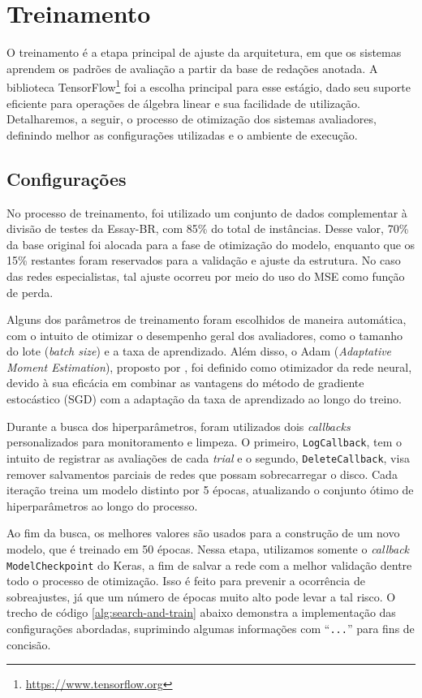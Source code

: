 \section{Treinamento}

O treinamento é a etapa principal de ajuste da arquitetura, em que os sistemas aprendem os padrões de avaliação a partir da base de redações anotada. A biblioteca TensorFlow\footnote{\url{https://www.tensorflow.org}} foi a escolha principal para esse estágio, dado seu suporte eficiente para operações de álgebra linear e sua facilidade de utilização. Detalharemos, a seguir, o processo de otimização dos sistemas avaliadores, definindo melhor as configurações utilizadas e o ambiente de execução.

\subsection{Configurações}
\label{subsec:training-configurations}

No processo de treinamento, foi utilizado um conjunto de dados complementar à divisão de testes da Essay-BR, com 85\% do total de instâncias. Desse valor, 70\% da base original foi alocada para a fase de otimização do modelo, enquanto que os 15\% restantes foram reservados para a validação e ajuste da estrutura. No caso das redes especialistas, tal ajuste ocorreu por meio do uso do MSE como função de perda.

Alguns dos parâmetros de treinamento foram escolhidos de maneira automática, com o intuito de otimizar o desempenho geral dos avaliadores, como o tamanho do lote (\textit{batch size}) e a taxa de aprendizado. Além disso, o Adam (\textit{Adaptative Moment Estimation}), proposto por \citet{kingma2017adam}, foi definido como otimizador da rede neural, devido à sua eficácia em combinar as vantagens do método de gradiente estocástico (SGD) com a adaptação da taxa de aprendizado ao longo do treino.

Durante a busca dos hiperparâmetros, foram utilizados dois \textit{callbacks} personalizados para monitoramento e limpeza. O primeiro, \texttt{LogCallback}, tem o intuito de registrar as avaliações de cada \textit{trial} e o segundo, \texttt{DeleteCallback}, visa remover salvamentos parciais de redes que possam sobrecarregar o disco. Cada iteração treina um modelo distinto por 5 épocas, atualizando o conjunto ótimo de hiperparâmetros ao longo do processo.

Ao fim da busca, os melhores valores são usados para a construção de um novo modelo, que é treinado em 50 épocas. Nessa etapa, utilizamos somente o \textit{callback} \texttt{ModelCheckpoint} do Keras, a fim de salvar a rede com a melhor validação dentre todo o processo de otimização. Isso é feito para prevenir a ocorrência de sobreajustes, já que um número de épocas muito alto pode levar a tal risco. O trecho de código \ref{alg:search-and-train} abaixo demonstra a implementação das configurações abordadas, suprimindo algumas informações com ``\texttt{...}'' para fins de concisão.

